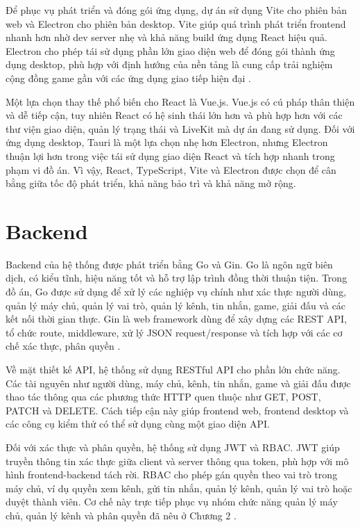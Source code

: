 \documentclass[../DoAn.tex]{subfiles}
\begin{document}
Để phục vụ phát triển và đóng gói ứng dụng, dự án sử dụng Vite cho phiên bản web và Electron cho phiên bản desktop. Vite giúp quá trình phát triển frontend nhanh hơn nhờ dev server nhẹ và khả năng build ứng dụng React hiệu quả. Electron cho phép tái sử dụng phần lớn giao diện web để đóng gói thành ứng dụng desktop, phù hợp với định hướng của nền tảng là cung cấp trải nghiệm cộng đồng game gần với các ứng dụng giao tiếp hiện đại \cite{vite-docs,electron-docs}.

Một lựa chọn thay thế phổ biến cho React là Vue.js. Vue.js có cú pháp thân thiện và dễ tiếp cận, tuy nhiên React có hệ sinh thái lớn hơn và phù hợp hơn với các thư viện giao diện, quản lý trạng thái và LiveKit mà dự án đang sử dụng. Đối với ứng dụng desktop, Tauri là một lựa chọn nhẹ hơn Electron, nhưng Electron thuận lợi hơn trong việc tái sử dụng giao diện React và tích hợp nhanh trong phạm vi đồ án. Vì vậy, React, TypeScript, Vite và Electron được chọn để cân bằng giữa tốc độ phát triển, khả năng bảo trì và khả năng mở rộng.

\section{Backend}
\label{section:3.3}

Backend của hệ thống được phát triển bằng Go và Gin. Go là ngôn ngữ biên dịch, có kiểu tĩnh, hiệu năng tốt và hỗ trợ lập trình đồng thời thuận tiện. Trong đồ án, Go được sử dụng để xử lý các nghiệp vụ chính như xác thực người dùng, quản lý máy chủ, quản lý vai trò, quản lý kênh, tin nhắn, game, giải đấu và các kết nối thời gian thực. Gin là web framework dùng để xây dựng các REST API, tổ chức route, middleware, xử lý JSON request/response và tích hợp với các cơ chế xác thực, phân quyền \cite{go-docs,gin-docs}.

Về mặt thiết kế API, hệ thống sử dụng RESTful API cho phần lớn chức năng. Các tài nguyên như người dùng, máy chủ, kênh, tin nhắn, game và giải đấu được thao tác thông qua các phương thức HTTP quen thuộc như GET, POST, PATCH và DELETE. Cách tiếp cận này giúp frontend web, frontend desktop và các công cụ kiểm thử có thể sử dụng cùng một giao diện API.

Đối với xác thực và phân quyền, hệ thống sử dụng JWT và RBAC. JWT giúp truyền thông tin xác thực giữa client và server thông qua token, phù hợp với mô hình frontend-backend tách rời. RBAC cho phép gán quyền theo vai trò trong máy chủ, ví dụ quyền xem kênh, gửi tin nhắn, quản lý kênh, quản lý vai trò hoặc duyệt thành viên. Cơ chế này trực tiếp phục vụ nhóm chức năng quản lý máy chủ, quản lý kênh và phân quyền đã nêu ở Chương 2 \cite{jwt-rfc7519}.
\end{document}
